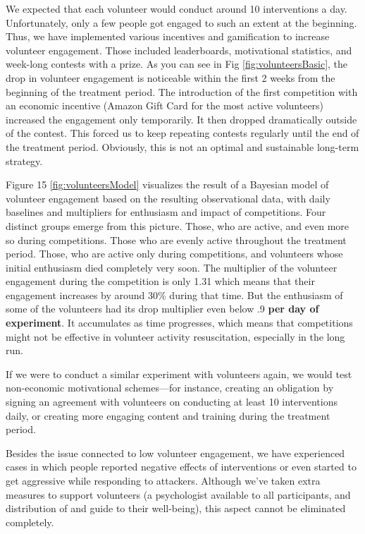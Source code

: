 \documentclass[preprint,12pt]{elsarticle}
\begin{document}
We expected that each volunteer would conduct around 10 interventions a day. Unfortunately, only a few people got engaged to such an extent at the beginning. Thus, we have implemented various incentives and gamification to increase volunteer engagement. Those included leaderboards, motivational statistics, and week-long contests with a prize. As you can see in Fig \ref{fig:volunteersBasic}, the drop in volunteer engagement is noticeable within the first 2 weeks from the beginning of the treatment period. The introduction of the first competition with an economic incentive (Amazon Gift Card for the most active volunteers) increased the engagement only temporarily. It then dropped dramatically outside of the contest. This forced us to keep repeating contests regularly until the end of the treatment period. Obviously, this is not an optimal and sustainable long-term strategy.

Figure 15 \ref{fig:volunteersModel}  visualizes the result of a Bayesian model of volunteer engagement based on the resulting observational data, with daily baselines and multipliers for enthusiasm and impact of competitions. Four distinct groups emerge from this picture. Those, who are active, and even  more  so during competitions. Those who are evenly active throughout the treatment period. Those, who are active only during competitions, and volunteers whose initial enthusiasm died completely very soon. The multiplier of the volunteer engagement during the competition is only 1.31 which means that their engagement increases by around 30\% during that time. But the enthusiasm of  some of the volunteers had  its drop multiplier even below .9 \textbf{per day of experiment}. It accumulates as time progresses, which means that competitions might not be  effective in volunteer activity resuscitation, especially in the long run. 

If we were to conduct a similar experiment with volunteers again, we would test  non-economic motivational schemes---for instance, creating an obligation by signing an agreement with volunteers on conducting at least 10 interventions daily, or creating more engaging content and training during the treatment period. 

Besides the issue connected to  low volunteer engagement, we have experienced cases in which people reported negative effects of interventions or even started to get aggressive while responding to attackers. Although we've taken extra measures to support volunteers (a psychologist available to all participants,  and distribution of and guide to their well-being), this aspect cannot be eliminated completely. 
\end{document}
